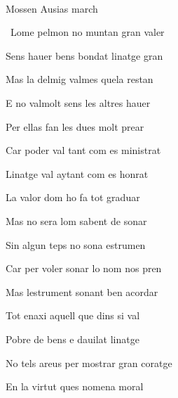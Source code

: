 \documentclass[12pt]{article}
\renewcommand{\espaiAbansEtiquetaPoema}{\vspace{0ex}}
\begin{document}
\begin{estrofa}

\espaiAbansEtiquetaPoema

\\

\begin{rubrica}

\textsection{} Mossen Ausias march \textsection{}

\end{rubrica}

\end{estrofa}


\begin{estrofa}

 \textparagraph\  Lome pelmon no muntan gran valer

 Sens hauer bens bondat linatge gran

 Mas la delmig valmes quela restan

 E no valmolt sens les altres hauer

 Per ellas fan les dues molt prear

 Car poder val tant com es ministrat

 Linatge val aytant com es honrat

 La valor dom ho fa tot graduar

\end{estrofa}



\begin{estrofa}

 Mas no sera lom sabent de sonar

 Sin algun teps no sona estrumen

 Car per voler sonar lo nom nos pren

 Mas lestrument sonant ben acordar

 Tot enaxi aquell que dins si val

 Pobre de bens e dauilat linatge

 No tels areus per mostrar gran coratge

 En la virtut ques nomena moral

\end{estrofa}
\end{document}
